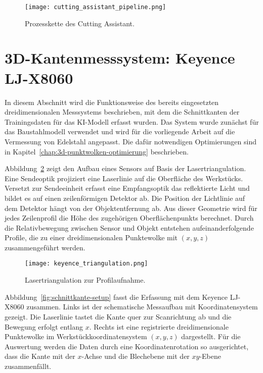 \begin{figure}[!htbp]
    \centering
    \texttt{[image: cutting\_assistant\_pipeline.png]}
    \caption{Prozesskette des Cutting Assistant.}
    \label{fig:cutting_assistant}
\end{figure}



\section{3D-Kantenmesssystem: Keyence LJ-X8060}
\label{sec:3d-messsystem-keyence}

In diesem Abschnitt wird die Funktionsweise des bereits eingesetzten dreidimensionalen Messsystems beschrieben, mit dem die Schnittkanten der Trainingsdaten für das KI-Modell erfasst wurden. Das System wurde zunächst für das Baustahlmodell verwendet und wird für die vorliegende Arbeit auf die Vermessung von Edelstahl angepasst. Die dafür notwendigen Optimierungen sind in Kapitel~\ref{chap:3d-punktwolken-optimierung} beschrieben.

Abbildung~\ref{fig:lasertriangulation-schema} zeigt den Aufbau eines Sensors auf Basis der Lasertriangulation. Eine Sendeoptik projiziert eine Laserlinie auf die Oberfläche des Werkstücks. Versetzt zur Sendeeinheit erfasst eine Empfangsoptik das reflektierte Licht und bildet es auf einen zeilenförmigen Detektor ab. Die Position der Lichtlinie auf dem Detektor hängt von der Objektentfernung ab. Aus dieser Geometrie wird für jedes Zeilenprofil die Höhe des zugehörigen Oberflächenpunkts berechnet. Durch die Relativbewegung zwischen Sensor und Objekt entstehen aufeinanderfolgende Profile, die zu einer dreidimensionalen Punktewolke mit \((x,y,z)\) zusammengeführt werden.

\begin{figure}[h!]
    \centering
    \texttt{[image: keyence\_triangulation.png]}
    \caption{Lasertriangulation zur Profilaufnahme.}
    \label{fig:lasertriangulation-schema}
\end{figure}

Abbildung~\ref{fig:schnittkante-setup} fasst die Erfassung mit dem Keyence LJ-X8060 zusammen. Links ist der schematische Messaufbau mit Koordinatensystem gezeigt. Die Laserlinie tastet die Kante quer zur Scanrichtung ab und die Bewegung erfolgt entlang \(x\). Rechts ist eine registrierte dreidimensionale Punktewolke im Werkstückkoordinatensystem \((x,y,z)\) dargestellt. Für die Auswertung werden die Daten durch eine Koordinatenrotation so ausgerichtet, dass die Kante mit der \(x\)-Achse und die Blechebene mit der \(xy\)-Ebene zusammenfällt.

